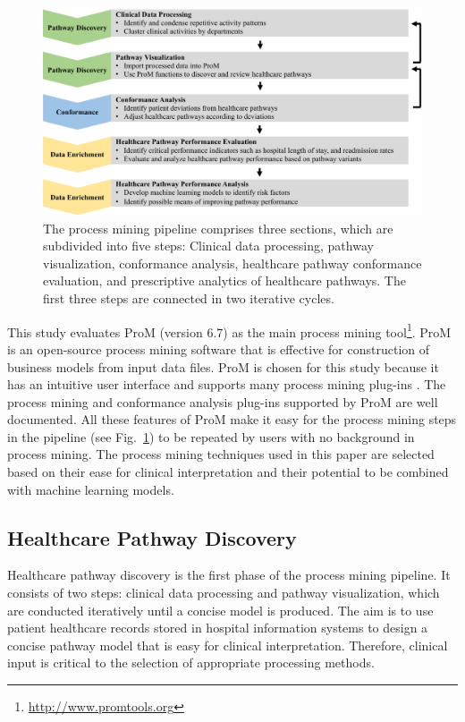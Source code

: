 \begin{figure}[t]
\centering
\includegraphics[width=\textwidth]{images/pipeline_diagram_journal.pdf}
\caption{The process mining pipeline comprises three sections, which
  are subdivided into five steps: Clinical data processing, pathway
  visualization, conformance analysis, healthcare pathway conformance
  evaluation, and prescriptive analytics of healthcare pathways. The
  first three steps are connected in two iterative cycles.}
\label{fig:pipeline}
\end{figure}

This study evaluates ProM (version 6.7) as the main process mining tool\footnote{\url{http://www.promtools.org}}. 
ProM is an open-source process mining software that is effective for construction of business models from input data files. ProM is chosen for this study because it has an intuitive user interface and supports many process mining plug-ins \cite{VanDongen2005}. The process mining and conformance analysis plug-ins supported by ProM are well documented. All these features of ProM make it easy for the process mining steps in the pipeline (see Fig.~\ref{fig:pipeline}) to be repeated by users with no background in process mining. The process mining techniques used in this paper are selected based on their ease for clinical interpretation and their potential to be combined with machine learning models. 

\subsection{Healthcare Pathway Discovery}
Healthcare pathway discovery is the first phase of the process mining pipeline. It consists of two steps: clinical data processing and pathway visualization, which are conducted iteratively until a concise model is produced.
The aim is to use patient healthcare records stored in hospital information systems to design a concise pathway model that is easy for clinical interpretation. Therefore, clinical input is critical to the selection of appropriate processing methods. 
 
